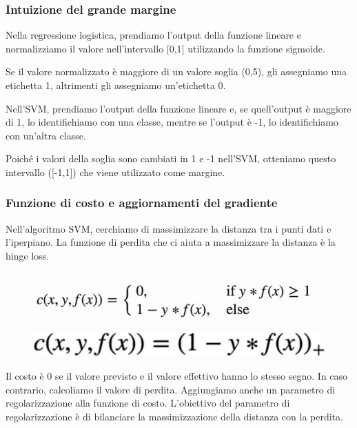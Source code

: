 \subsubsection{Intuizione del grande margine}
Nella regressione logistica, prendiamo l'output della funzione lineare e normalizziamo il valore nell'intervallo  [0,1] utilizzando la funzione sigmoide. 

Se il valore normalizzato è maggiore di un valore soglia (0,5), gli assegniamo una etichetta 1, altrimenti gli assegniamo un'etichetta 0. 

Nell'SVM, prendiamo l'output della funzione lineare e, se quell'output è maggiore di 1, lo identifichiamo con una classe, mentre se l'output è -1, lo identifichiamo con un'altra classe. 

Poiché i valori della soglia sono cambiati in 1 e -1 nell'SVM, otteniamo questo intervallo ([-1,1]) che viene utilizzato come margine.


\subsubsection{Funzione di costo e aggiornamenti del gradiente}
Nell'algoritmo SVM, cerchiamo di massimizzare la distanza tra i punti dati e l'iperpiano. La funzione di perdita che ci aiuta a massimizzare la distanza è la hinge loss.
\begin{figure}[h]
  \begin{minipage}[b]{0.45\linewidth}
    \centering
    \includegraphics[width=\linewidth]{images/image29.jpeg}
  \end{minipage}
  \begin{minipage}[b]{0.45\linewidth}
    \centering
    \includegraphics[width=\linewidth]{images/image30.jpeg}
  \end{minipage}
\end{figure}

Il costo è 0 se il valore previsto e il valore eﬀettivo hanno lo stesso segno. In caso contrario, calcoliamo il valore di perdita. Aggiungiamo anche un parametro di regolarizzazione alla funzione di costo. L'obiettivo del
parametro di regolarizzazione è di bilanciare la massimizzazione della distanza con la perdita. 

